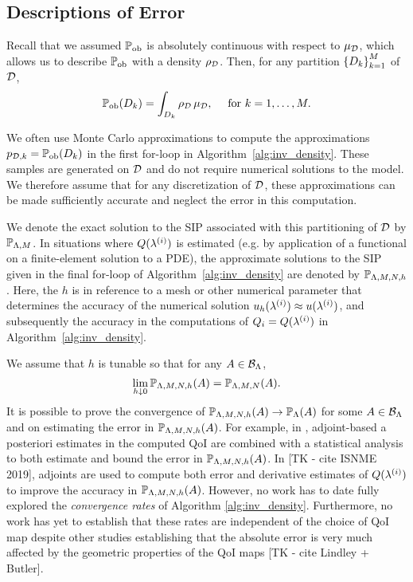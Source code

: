 \subsection{Descriptions of Error}\label{sec:set-error}
Recall that we assumed $\operatorname*{\mathbb{P}_{ob}}$ is absolutely continuous with respect to $\mu_{\mathcal{D}}$, which allows us to describe $\operatorname*{\mathbb{P}_{ob}}$ with a density $\rho_{\mathcal{D}}$. Then, for any partition $\left\{D_k\right\}_{k=1}^{M}$ of $\mathcal{D}$,
\[
\operatorname*{\mathbb{P}_{ob}} (D_k) = \int_{D_k} \rho_{\mathcal{D}} \, \mu_{\mathcal{D}}, \quad \text{ for } k = 1, \hdots, M.
\]

We often use Monte Carlo approximations to compute the approximations $p_{\mathcal{D}, k}=\operatorname*{\mathbb{P}_{ob}}(D_k)$ in the first for-loop in Algorithm~\ref{alg:inv_density}.
These samples are generated on $\mathcal{D}$ and do not require numerical solutions to the model.
We therefore assume that for any discretization of $\mathcal{D}$, these approximations can be made sufficiently accurate and neglect the error in this computation.

We denote the exact solution to the SIP associated with this partitioning of $\mathcal{D}$ by $\mathbb{P}_{{\Lambda}, M}$.
In situations where $Q(\lambda^{(i)})$ is estimated (e.g. by application of a functional on a finite-element solution to a PDE), the approximate solutions to the SIP given in the final for-loop of Algorithm~\ref{alg:inv_density} are denoted by $\mathbb{P}_{{\Lambda}, M, N, h}$.
Here, the $h$ is in reference to a mesh or other numerical parameter that determines the accuracy of the numerical solution $u_h(\lambda^{(i)})\approx u(\lambda^{(i)})$, and subsequently the accuracy in the computations of $Q_i = Q(\lambda^{(i)})$ in Algorithm~\ref{alg:inv_density}.

We assume that $h$ is tunable so that for any $A\in \mathcal{B}_{{\Lambda}}$,
\[
\lim\limits_{h \downarrow 0} \mathbb{P}_{{\Lambda}, M, N, h} (A) = \mathbb{P}_{{\Lambda}, M, N} (A).
\]
It is possible to prove the convergence of $\mathbb{P}_{{\Lambda}, M, N, h} (A) \to \mathbb{P}_{\Lambda} (A)$ for some $A\in \mathcal{B}_{{\Lambda}}$ and on estimating the error in $\mathbb{P}_{{\Lambda}, M, N, h}(A)$.
For example, in \cite{BGE+15}, adjoint-based a posteriori estimates in the computed QoI are combined with a statistical analysis to both estimate and bound the error in $\mathbb{P}_{{\Lambda}, M, N, h} (A)$.
In [TK - cite ISNME 2019], adjoints are used to compute both error and derivative estimates of $Q(\lambda^{(i)})$ to improve the accuracy in $\mathbb{P}_{{\Lambda}, M, N, h} (A)$.
However, no work has to date fully explored the \emph{convergence rates} of Algorithm \ref{alg:inv_density}.
Furthermore, no work has yet to establish that these rates are independent of the choice of QoI map despite other studies establishing that the absolute error is very much affected by the geometric properties of the QoI maps [TK - cite Lindley + Butler].


